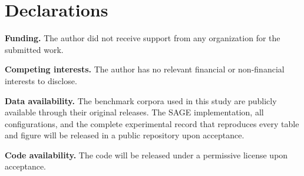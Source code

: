 \documentclass[pdflatex,sn-basic,Numbered]{sn-jnl}
\begin{document}
\section*{Declarations}

\noindent\textbf{Funding.}%
The author did not receive support from any organization for the
submitted work.

\smallskip
\noindent\textbf{Competing interests.}%
The author has no relevant financial or non-financial interests to
disclose.

\smallskip
\noindent\textbf{Data availability.}%
The benchmark corpora used in this study are publicly available through
their original releases. The SAGE implementation, all configurations,
and the complete experimental record that reproduces every table and
figure will be released in a public repository upon acceptance.

\smallskip
\noindent\textbf{Code availability.}%
The code will be released under a permissive license upon acceptance.

\begin{appendices}

\setcounter{figure}{8}%
\renewcommand{\thefigure}{\arabic{figure}}%
\setcounter{table}{7}%
\renewcommand{\thetable}{\arabic{table}}%



\end{appendices}

%
\end{document}
